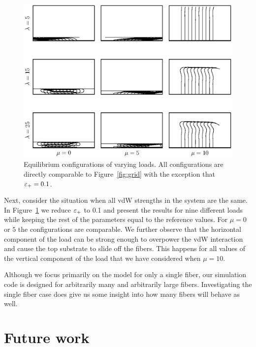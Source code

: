 	\begin{figure}
		\begin{center}
			\includegraphics[scale=1]{./fig/ch4/grid_et0.1.eps}
		\end{center}		
		\caption{Equilibrium configurations of varying loads. All configurations are directly comparable to Figure~\ref{fig:grid} with the exception that $\varepsilon_+ = 0.1$.
		\label{fig:grid_et0.1}}
	\end{figure}

	Next, consider the situation when all vdW strengths in the system are the same. In Figure~\ref{fig:grid_et0.1} we reduce $\varepsilon_+$ to 0.1 and present the results for nine different loads while keeping the rest of the parameters equal to the reference values. For $\mu = 0$ or $5$ the configurations are comparable. We further observe that the horizontal component of the load can be strong enough to overpower the vdW interaction and cause the top substrate to slide off the fibers. This happens for all values of the vertical component of the load that we have considered when $\mu = 10$.
	
	Although we focus primarily on the model for only a single fiber, our simulation code is designed for arbitrarily many and arbitrarily large fibers. Investigating the single fiber case does give us some insight into how many fibers will behave as well.

\section{Future work}

